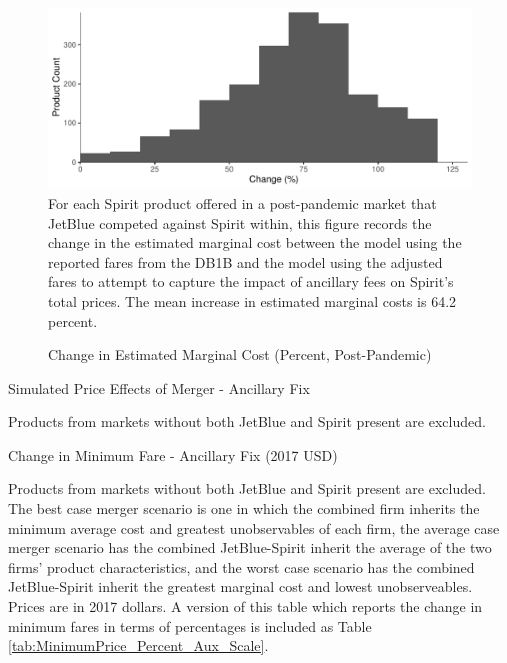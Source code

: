 \documentclass{article}
\begin{document}
    \begin{figure}
        \caption{Change in Estimated Marginal Cost (Percent, Post-Pandemic)}
        \label{tab:Fee_Fix_postpandemic_MC_PercentChange}
        \includegraphics[width = \linewidth]{Fee_Fix_MC_Graph_Percent_JBMarket.pdf}
        \footnotesize{For each Spirit product offered in a post-pandemic market that JetBlue competed against Spirit within, this figure records the change in the estimated marginal cost between the model using the reported fares from the DB1B and the model using the adjusted fares to attempt to capture the impact of ancillary fees on Spirit's total prices. The mean increase in estimated marginal costs is 64.2 percent.}
    \end{figure}


    \begin{table}
        \caption{Simulated Price Effects of Merger - Ancillary Fix}
        \label{tab:Simulation_Price_Aux_Scale}
                \vspace{-15mm}
        \begin{center}
        
        \end{center}
        \vspace{-5mm}
        \footnotesize{Products from markets without both JetBlue and Spirit present are excluded.}

     \end{table}

    \begin{table}
        \caption{Change in Minimum Fare - Ancillary Fix (2017 USD)}
        \label{tab:MinimumPrice_Aux_Scale}
                \vspace{-15mm}
        \begin{center}

        \end{center}
        \vspace{-5mm}
        \footnotesize{Products from markets without both JetBlue and Spirit present are excluded. The best case merger scenario is one in which the combined firm inherits the minimum average cost and greatest unobservables of each firm, the average case merger scenario has the combined JetBlue-Spirit inherit the average of the two firms' product characteristics, and the worst case scenario has the combined JetBlue-Spirit inherit the greatest marginal cost and lowest unobserveables. Prices are in 2017 dollars. A version of this table which reports the change in minimum fares in terms of percentages is included as Table \ref{tab:MinimumPrice_Percent_Aux_Scale}.}
    \end{table}    
\end{document}
